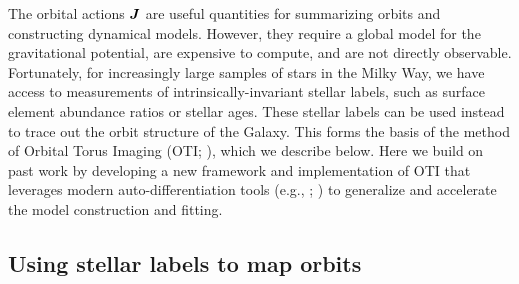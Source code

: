 The orbital actions $\boldsymbol{J}$ are useful quantities for summarizing orbits and
constructing dynamical models.
However, they require a global model for the gravitational potential, are expensive to
compute, and are not directly observable.
Fortunately, for increasingly large samples of stars in the Milky Way, we have access to
measurements of intrinsically-invariant stellar labels, such as surface element
abundance ratios or stellar ages.
These stellar labels can be used instead to trace out the orbit structure of the Galaxy.
This forms the basis of the method of Orbital Torus Imaging (OTI; \citealt{PW:2021}),
which we describe below.
Here we build on past work by developing a new framework and implementation of OTI that
leverages modern auto-differentiation tools (e.g., \jax; \citealt{jax:2018}) to
generalize and accelerate the model construction and fitting.


\subsection{Using stellar labels to map orbits}
\label{sec:oti-stat}





